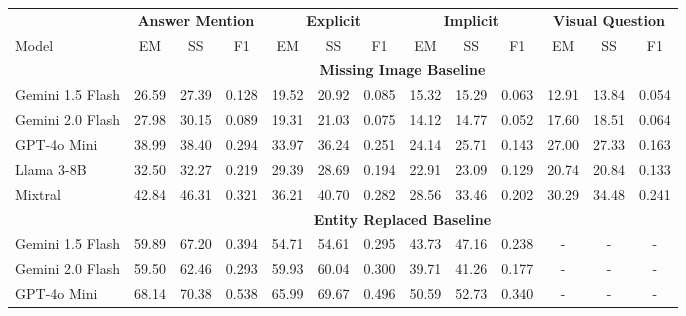 \documentclass[11pt]{article}
\begin{document}

\begin{table}[t]
\vspace{-0.5em}
\scriptsize
\centering
\setlength{\aboverulesep}{0pt}
\setlength{\belowrulesep}{0pt}
\setlength{\tabcolsep}{8pt}
\begin{tabular}{lccc|ccc|ccc|ccc}
\toprule
\multicolumn{1}{c}{} & \multicolumn{3}{c|}{\textbf{Answer Mention}} & \multicolumn{3}{c|}{\textbf{Explicit}} & \multicolumn{3}{c|}{\textbf{Implicit}} & \multicolumn{3}{c}{\textbf{Visual Question}} \\
\cmidrule{2-13}
Model & EM & SS & F1 & EM & SS & F1 & EM & SS & F1 & EM & SS & F1 \\
\cmidrule{2-13}
& \multicolumn{12}{c}{\textbf{Missing Image Baseline}} \\
\cmidrule{1-13}
Gemini 1.5 Flash & 26.59 & 27.39 & 0.128 & 19.52 & 20.92 & 0.085 & 15.32 & 15.29 & 0.063 & 12.91 & 13.84 & 0.054 \\
Gemini 2.0 Flash & 27.98 & 30.15 & 0.089 & 19.31 & 21.03 & 0.075 & 14.12 & 14.77 & 0.052 & 17.60 & 18.51 & 0.064 \\
GPT-4o Mini & 38.99 & 38.40 & 0.294 & 33.97 & 36.24 & 0.251 & 24.14 & 25.71 & 0.143 & 27.00 & 27.33 & 0.163 \\
Llama 3-8B & 32.50 & 32.27 & 0.219 & 29.39 & 28.69 & 0.194 & 22.91 & 23.09 & 0.129 & 20.74 & 20.84 & 0.133 \\
Mixtral & \cellcolor{yellow}42.84 & \cellcolor{yellow}46.31 & \cellcolor{yellow}0.321 & \cellcolor{yellow}36.21 & \cellcolor{yellow}40.70 & \cellcolor{yellow}0.282 & \cellcolor{yellow}28.56 & \cellcolor{yellow}33.46 & \cellcolor{yellow}0.202 & \cellcolor{yellow}30.29 & \cellcolor{yellow}34.48 & \cellcolor{yellow}0.241 \\
\cmidrule{2-13}
& \multicolumn{12}{c}{\textbf{Entity Replaced Baseline}} \\
\cmidrule{2-13}
Gemini 1.5 Flash & 59.89 & 67.20 & 0.394 & 54.71 & 54.61 & 0.295 & 43.73 & 47.16 & 0.238 & - & - & - \\
Gemini 2.0 Flash & 59.50 & 62.46 & 0.293 & 59.93 & 60.04 & 0.300 & 39.71 & 41.26 & 0.177 & - & - & - \\
GPT-4o Mini & \cellcolor{yellow}68.14 & \cellcolor{yellow}70.38 & \cellcolor{yellow}0.538 & \cellcolor{yellow}65.99 & \cellcolor{yellow}69.67 & \cellcolor{yellow}0.496 & \cellcolor{yellow}50.59 & \cellcolor{yellow}52.73 & \cellcolor{yellow}0.340 & - & - & - \\

\end{tabular}
\end{table}
\end{document}
